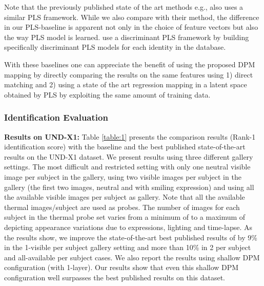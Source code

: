 \documentclass[smallextended,natbib]{svjour3}       \usepackage{graphicx}
\begin{document}
Note that the previously published state of the art methods e.g., \cite{hu2015} also uses a similar PLS framework. While we also compare with their method, the difference in our PLS-baseline is apparent not only in the choice of feature vectors but also the way PLS model is learned. \cite{hu2015} use a discriminant PLS framework by building specifically discriminant PLS models for each identity in the database. 

With these baselines one can appreciate the benefit of using the proposed DPM mapping by directly comparing the results on the same features using 1) direct matching and 2) using a state of the art regression mapping in a latent space obtained by PLS by exploiting the same amount of training data.  

\subsubsection{Identification Evaluation}
\textbf{Results on UND-X1:} Table \ref{table:1} presents the comparison results (Rank-1 identification score) with the baseline and the best published state-of-the-art results on the UND-X1 dataset. We present results using three different gallery settings. The most difficult and restricted setting with only one neutral visible image per subject in the gallery, using two visible images per subject in the gallery (the first two images, neutral and with smiling expression) and using all the available visible images per subject as gallery. Note that all the available thermal images/subject are used as probes. The number of images for each subject in the thermal probe set varies from a minimum of  to a maximum of  depicting appearance variations due to expressions, lighting and time-lapse. As the results show, we improve the state-of-the-art best published results of \cite{hu2015} by 9\% in the 1-visible per subject gallery setting and more than 10\% in 2 per subject and all-available per subject cases. We also report the results using shallow DPM configuration (with 1-layer). Our results show that even this shallow DPM configuration well surpasses the best published results on this dataset.
\end{document}
